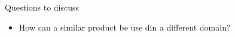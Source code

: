 \documentclass[12pt, onecolumn]{IEEEtran}
\begin{document}
\noindent Questions to discuss
\begin{itemize}
  \item How can a similar product be use din a different domain?
\end{itemize}
\bigskip\bigskip



\end{document}
